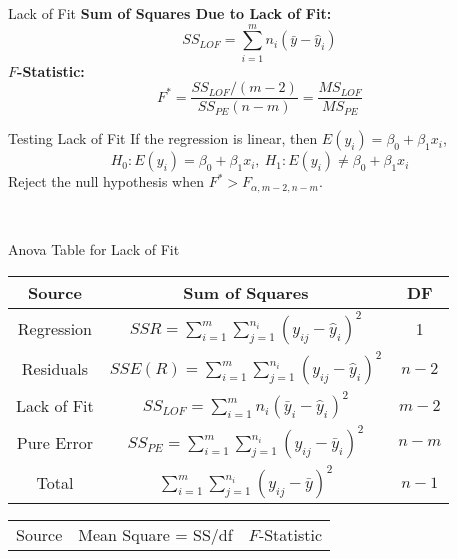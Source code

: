 \documentclass{article}
\begin{document}
\begin{multicols*}{3}
\begin{blackbox}{Lack of Fit}
        \textbf{Sum of Squares Due to Lack of Fit:}\\[-2ex]
        \[SS_{LOF} = \sum_{i=1}^m n_i(\bar{y} - \hat{y}_i)\]
        \textbf{$F$-Statistic:}\\[-2ex]
        \[F^* = \frac{SS_{LOF}/(m-2)}{SS_{PE}(n-m)} = \frac{MS_{LOF}}{MS_{PE}}\]
        \begin{bluebox}{Testing Lack of Fit}
            If the regression is linear, then $E(y_i) = \beta_0 + \beta_1x_i$, \\[-1.5ex]
            \[H_0: E(y_i) = \beta_0 + \beta_1x_i, \ H_1: E(y_i) \neq \beta_0 + \beta_1x_i\]
            Reject the null hypothesis when $F^* > F_{\alpha, m-2, n-m}$.
        \end{bluebox}\\[-2ex]
    \end{blackbox}
    \renewcommand{\arraystretch}{1.5}
    \begin{blackbox}{Anova Table for Lack of Fit}
        \begin{center}
            \begin{tabular}{|c|c|c|}
                \hline
                Source & Sum of Squares & DF\\
                \hline 
                \hline 
                Regression & $SSR = \sum\limits_{i=1}^m\sum\limits_{j=1}^{n_i} (y_{ij} - \hat{y}_i)^2$ & 1\\
                \hline
                Residuals & $SSE(R) = \sum\limits_{i=1}^m\sum\limits_{j=1}^{n_i}(y_{ij} - \hat{y}_i)^2$ & $n-2$ \\
                \hline
                Lack of Fit & $SS_{LOF} = \sum\limits_{i=1}^m n_i(\bar{y}_i - \hat{y}_i)^2$ & $m-2$ \\
                \hline
                Pure Error & $SS_{PE} = \sum\limits_{i=1}^m\sum\limits_{j=1}^{n_i} (y_{ij}-\bar{y}_i)^2$ & $n-m$ \\
                \hline
                Total & $\sum\limits_{i=1}^m\sum\limits_{j=1}^{n_i}(y_{ij} - \bar{y})^2$ & $n-1$  \\
                \hline
            \end{tabular}
        \end{center}
        \renewcommand{\arraystretch}{1.5}
        \begin{center}            
            \begin{tabular}{|c|c|c|}
                \hline
                Source & Mean Square = SS/df & $F$-Statistic\\

\end{tabular}
\end{center}
\end{blackbox}
\end{multicols*}
\end{document}
